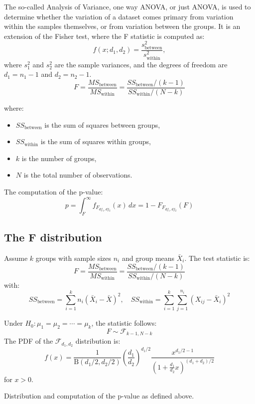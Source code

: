 \documentclass{book}
\begin{document}
The so-called Analysis of Variance, one way ANOVA, or just ANOVA, is used to determine whether the variation of a dataset comes primary from variation within the samples themselves, or from variation between the groups. It is an extension of the Fisher test, where the F statistic is computed as:
\[
    f(x; d_{1}, d_{2}) = \frac{s_\text{between}^{2}}{s_\text{within}^{2}},
\]
where $s_1^{2}$ and $s_2^{2}$ are the sample variances, and the degrees of freedom are $d_1 = n_1 - 1$ and $d_2 = n_2 - 1$.\\

\[
F = \frac{MS_{\text{between}}}{MS_{\text{within}}} = \frac{SS_{\text{between}} / (k - 1)}{SS_{\text{within}} / (N - k)}
\]

where:
\begin{itemize}
  \item $SS_{\text{between}}$ is the sum of squares between groups,
  \item $SS_{\text{within}}$ is the sum of squares within groups,
  \item $k$ is the number of groups,
  \item $N$ is the total number of observations.
\end{itemize}

The computation of the p-value:
\[
p = \int_{F}^{\infty} f_{F_{df_1, df_2}}(x)\,dx = 1 - F_{F_{df_1, df_2}}(F)
\]

\subsection*{The F distribution}

Assume \( k \) groups with sample sizes \( n_i \) and group means \( \bar{X}_i \). The test statistic is:
\[
F = \frac{MS_{\text{between}}}{MS_{\text{within}}} = \frac{SS_{\text{between}} / (k - 1)}{SS_{\text{within}} / (N - k)}
\]
with:
\[
SS_{\text{between}} = \sum_{i=1}^{k} n_i (\bar{X}_i - \bar{X})^2, \quad SS_{\text{within}} = \sum_{i=1}^{k} \sum_{j=1}^{n_i} (X_{ij} - \bar{X}_i)^2
\]

Under \( H_0: \mu_1 = \mu_2 = \cdots = \mu_k \), the statistic follows:
\[
F \sim \mathcal{F}_{k-1, N-k}
\]
The PDF of the \( \mathcal{F}_{d_1, d_2} \) distribution is:
\[
f(x) = \frac{1}{\mathrm{B}(d_1/2, d_2/2)} \left(\frac{d_1}{d_2}\right)^{d_1/2} \frac{x^{d_1/2 - 1}}{\left(1 + \frac{d_1}{d_2}x\right)^{(d_1 + d_2)/2}}
\]
for \( x > 0 \).

Distribution and computation of the p-value as defined above.
\end{document}
